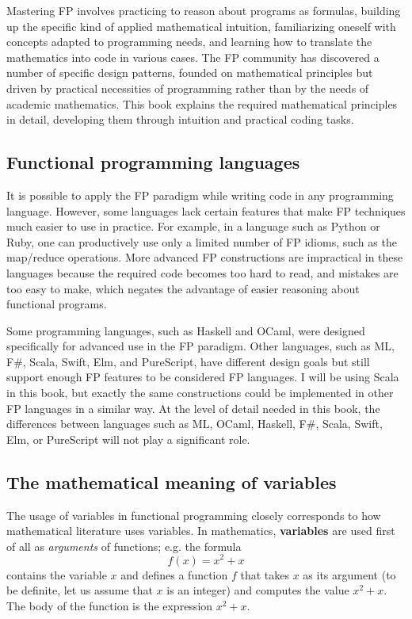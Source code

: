 Mastering FP involves practicing to reason about programs as formulas,
building up the specific kind of applied mathematical intuition, familiarizing
oneself with concepts adapted to programming needs, and learning how
to translate the mathematics into code in various cases. The FP community
has discovered a number of specific design patterns, founded on mathematical
principles but driven by practical necessities of programming rather
than by the needs of academic mathematics. This book explains the
required mathematical principles in detail, developing them through
intuition and practical coding tasks.

\subsection{Functional programming languages}

It is possible to apply the FP paradigm while writing code in any
programming language. However, some languages lack certain features
that make FP techniques much easier to use in practice. For example,
in a language such as Python or Ruby, one can productively use only
a limited number of FP idioms, such as the map/reduce operations.
More advanced FP constructions are impractical in these languages
because the required code becomes too hard to read, and mistakes are
too easy to make, which negates the advantage of easier reasoning
about functional programs.

Some programming languages, such as Haskell and OCaml, were designed
specifically for advanced use in the FP paradigm. Other languages,
such as ML, F\#, Scala, Swift, Elm, and PureScript, have different
design goals but still support enough FP features to be considered
FP languages. I will be using Scala in this book, but exactly the
same constructions could be implemented in other FP languages in a
similar way. At the level of detail needed in this book, the differences
between languages such as ML, OCaml, Haskell, F\#, Scala, Swift, Elm,
or PureScript will not play a significant role.

\subsection{The mathematical meaning of variables}

The usage of variables in functional programming closely corresponds
to how mathematical literature uses variables. In mathematics, \textbf{variables}
are used first of all as \emph{arguments} of functions; e.g. the formula
\[
f(x)=x^{2}+x
\]
contains the variable $x$ and defines a function $f$ that takes
$x$ as its argument (to be definite, let us assume that $x$ is an
integer) and computes the value $x^{2}+x$. The body of the function
is the expression $x^{2}+x$. 

